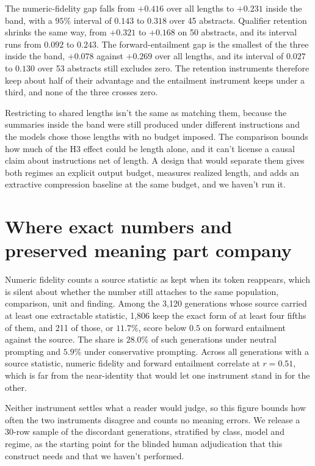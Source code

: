 \documentclass{article}
\begin{document}
The numeric-fidelity gap falls from $+0.416$ over all lengths to $+0.231$ inside the band, with a $95\%$ interval of $0.143$ to $0.318$ over 45 abstracts. Qualifier retention shrinks the same way, from $+0.321$ to $+0.168$ on 50 abstracts, and its interval runs from $0.092$ to $0.243$. The forward-entailment gap is the smallest of the three inside the band, $+0.078$ against $+0.269$ over all lengths, and its interval of $0.027$ to $0.130$ over 53 abstracts still excludes zero. The retention instruments therefore keep about half of their advantage and the entailment instrument keeps under a third, and none of the three crosses zero.

Restricting to shared lengths isn't the same as matching them, because the summaries inside the band were still produced under different instructions and the models chose those lengths with no budget imposed. The comparison bounds how much of the H3 effect could be length alone, and it can't license a causal claim about instructions net of length. A design that would separate them gives both regimes an explicit output budget, measures realized length, and adds an extractive compression baseline at the same budget, and we haven't run it.

\section{Where exact numbers and preserved meaning part company}
\label{app:meaning}

Numeric fidelity counts a source statistic as kept when its token reappears, which is silent about whether the number still attaches to the same population, comparison, unit and finding. Among the 3{,}120 generations whose source carried at least one extractable statistic, 1{,}806 keep the exact form of at least four fifths of them, and 211 of those, or $11.7\%$, score below $0.5$ on forward entailment against the source. The share is $28.0\%$ of such generations under neutral prompting and $5.9\%$ under conservative prompting. Across all generations with a source statistic, numeric fidelity and forward entailment correlate at $r = 0.51$, which is far from the near-identity that would let one instrument stand in for the other.

Neither instrument settles what a reader would judge, so this figure bounds how often the two instruments disagree and counts no meaning errors. We release a 30-row sample of the discordant generations, stratified by class, model and regime, as the starting point for the blinded human adjudication that this construct needs and that we haven't performed.
\end{document}
